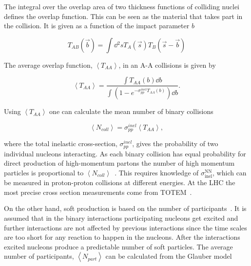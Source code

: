 The integral over the overlap area of two thickness functions of colliding nuclei defines the overlap function. This can be seen as the material that takes part in the collision. It is given as a function of the impact parameter $b$

\begin{equation}
T_{AB}\left(\vec b\right)=\int \dd{^2s} T_A\left(\vec s\right) T_B\left(\vec s - \vec b\right)
\end{equation}

\noindent The average overlap function, $\left<T_{AA}\right>$, in an A-A collisions  is given by~\cite{Afanasiev:2009aa}

\begin{equation}
\left<T_{AA}\right>=\frac{\int T_{AA}\left(b\right) \dd b}
{\int\left(1-e^{-\sigma^{inel}_{pp}T_{AA}\left(b\right)}\right)\dd b}.
\end{equation}

\noindent Using $\left<T_{AA}\right>$ one can calculate the mean number of binary collisions

\begin{equation}
\left<N_{coll}\right>=\sigma_{pp}^{inel}\left<T_{AA}\right>,
\end{equation}

\noindent where the total inelastic cross-section, $\sigma_{pp}^{inel}$, gives the probability of two individual nucleons interacting. As each binary collision has equal probability for direct production of high-momentum partons the number of high momentum particles is proportional to $\left<N_{coll}\right>$~\cite{Abelev:2013qoq,Kharzeev:2004if,Deng:2010mv}. This requires knowledge of $\sigma\mathrm{^{NN}_{inel}}$, which can be measured in proton-proton collisions at different energies. At the LHC the most precise cross section measurements come from TOTEM~\cite{Antchev:2017dia}.

On the other hand, soft production is based on the number of participants~\cite{Kharzeev:2004if}. It is assumed that in the binary interactions participating nucleons get excited and further interactions are not affected by previous interactions since the time scales are too short for any reaction to happen in the nucleons. After the interactions excited nucleons produce a predictable number of soft particles. The average number of participants, $\left<N_{part}\right>$ can be calculated from the Glauber model 


